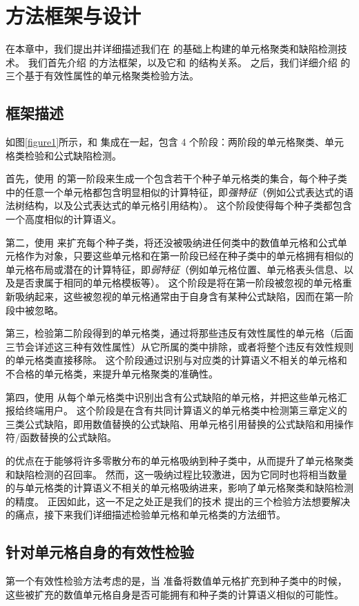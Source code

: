 \chapter{方法框架与设计}
在本章中，我们提出并详细描述我们在 \cu 的基础上构建的单元格聚类和缺陷检测技术\wa 。
我们首先介绍 \wa 的方法框架，以及它和 \cu 的结构关系。
之后，我们详细介绍 \wa 的三个基于有效性属性的单元格聚类检验方法。


\section{框架描述}
如图\ref{figure1}所示，\wa 和 \cu 集成在一起，包含 4 个阶段：两阶段的单元格聚类、单元格类检验和公式缺陷检测。

首先，\wa 使用 \cu 的第一阶段来生成一个包含若干个种子单元格类的集合，每个种子类中的任意一个单元格都包含明显相似的计算特征，即\textit{强特征}（例如公式表达式的语法树结构，以及公式表达式的单元格引用结构）。
这个阶段使得每个种子类都包含一个高度相似的计算语义。

第二，\wa 使用 \cu 来扩充每个种子类，将还没被吸纳进任何类中的数值单元格和公式单元格作为对象，只要这些单元格和在第一阶段已经在种子类中的单元格拥有相似的单元格布局或潜在的计算特征，即\textit{弱特征}（例如单元格位置、单元格表头信息、以及是否隶属于相同的单元格模板等）。
这个阶段是将在第一阶段被忽视的单元格重新吸纳起来，这些被忽视的单元格通常由于自身含有某种公式缺陷，因而在第一阶段中被忽略。

第三，\wa 检验第二阶段得到的单元格类，通过将那些违反有效性属性的单元格（后面三节会详述这三种有效性属性）从它所属的类中排除，或者将整个违反有效性规则的单元格类直接移除。
这个阶段通过识别与对应类的计算语义不相关的单元格和不合格的单元格类，来提升单元格聚类的准确性。

第四，\wa 使用 \cu 从每个单元格类中识别出含有公式缺陷的单元格，并把这些单元格汇报给终端用户。
这个阶段是在含有共同计算语义的单元格类中检测第三章定义的三类公式缺陷，即用数值替换的公式缺陷、用单元格引用替换的公式缺陷和用操作符/函数替换的公式缺陷。

\cu 的优点在于能够将许多零散分布的单元格吸纳到种子类中，从而提升了单元格聚类和缺陷检测的召回率\cite{cheung2016custodes}。
然而，这一吸纳过程比较激进，因为它同时也将相当数量的与单元格类的计算语义不相关的单元格吸纳进来，影响了单元格聚类和缺陷检测的精度。
正因如此，这一不足之处正是我们的技术 \wa 提出的三个检验方法想要解决的痛点，接下来我们详细描述检验单元格和单元格类的方法细节。



\section{针对单元格自身的有效性检验}

第一个有效性检验方法考虑的是，当 \wa 准备将数值单元格扩充到种子类中的时候，这些被扩充的数值单元格自身是否可能拥有和种子类的计算语义相似的可能性。

